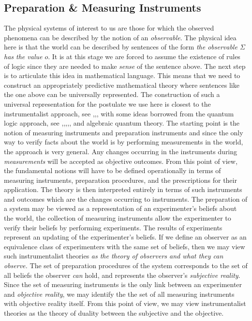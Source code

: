 \documentclass[11pt]{article}
\begin{document}
\subsection*{Preparation \& Measuring Instruments}
The physical systems of interest to us are those for which the observed phenomena can be described by the notion of an \emph{observable}. The physical idea here is that the world can be described by sentences of the form \emph{the observable $\Sigma$ has the value $o$}. It is at this stage we are forced to assume  the existence of rules of logic since they are needed to make \emph{sense} of the sentence above. The next step is to articulate this idea in mathematical language. This means that we need to construct an appropriately predictive mathematical theory where sentences like the one above can be universally represented. The construction of such a universal representation for the postulate we use here is closest to the instrumentalist approach, see \cite{Kraus},\cite{Ludwig1},\cite{Ludwig2}, with some ideas borrowed from the quantum logic approach, see \cite{Jauch},\cite{Kalmbach},\cite{Peres},\cite{Varadarajan},\cite{vonNeumann}, and algebraic quantum theory. The starting point is the notion of measuring instruments and preparation instruments and since the only way to verify facts about the world is by performing measurements in the world, the approach is very general. Any changes occurring in the instruments during \emph{measurements} will be accepted as objective outcomes. From this point of view, the fundamental notions will have to be defined operationally in terms of measuring instruments, preparation procedures, and the prescriptions for their application. The theory is then interpreted entirely in terms of such instruments and outcomes which are the changes occurring to instruments. 
\noindent The preparation of a system may be viewed as a representation of an experimenter's beliefs about the world, the collection of measuring instruments allow the experimenter to verify their beliefs by performing experiments. The results of experiments represent an updating of the experimenter's beliefs. If we define an observer as an equivalence class of experimenters with the same set of beliefs, then we may view such instrumentalist theories \emph{as the theory of observers and what they can observe.} The set of preparation procedures of the system corresponds to the set of all beliefs the observer \emph{can} hold, and represents the observer's \emph{subjective reality}. Since the set of measuring instruments is the only link between an experimenter and \emph{objective reality}, we may identify the the set of all measuring instruments with objective reality itself. From this point of view, we may view instrumentalist theories as the theory of duality between the subjective and the objective. 
\end{document}
